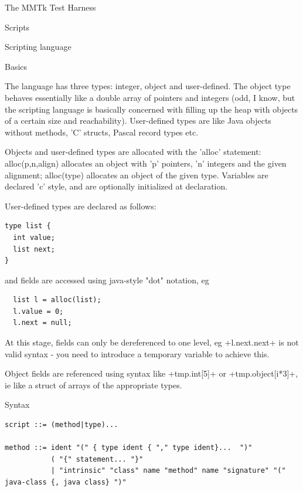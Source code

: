 \begin{section}{The MMTk Test Harness}
\begin{subsection}{Scripts}
\end{subsection}

\begin{subsection}{Scripting language}

\begin{subsubsection}{Basics}

The language has three types: integer, object and user-defined. The object type behaves essentially like a double array of pointers and integers (odd, I know, but the scripting language is basically concerned with filling up the heap with objects of a certain size and reachability).  User-defined types are like Java objects without methods, 'C' structs, Pascal record types etc.

Objects and user-defined types are allocated with the 'alloc' statement: alloc(p,n,align) allocates an object with 'p' pointers, 'n' integers and the given alignment; alloc(type) allocates an object of the given type.  Variables are declared 'c' style, and are optionally initialized at declaration.

User-defined types are declared as follows:

\begin{lstlisting}
type list {
  int value;
  list next;
}
\end{lstlisting}

and fields are accessed using java-style "dot" notation, eg
\begin{lstlisting}
  list l = alloc(list);
  l.value = 0;
  l.next = null;
\end{lstlisting}

At this stage, fields can only be dereferenced to one level, eg \spverb+l.next.next+ is not valid syntax - you need to introduce a temporary variable to achieve this.

Object fields are referenced using syntax like \spverb+tmp.int[5]+ or \spverb+tmp.object[i*3]+,
ie like a struct of arrays of the appropriate types.

\end{subsubsection}

\begin{subsubsection}{Syntax}

\begin{lstlisting}
script ::= (method|type)...

method ::= ident "(" { type ident { "," type ident}...  ")"
           ( "{" statement... "}"
           | "intrinsic" "class" name "method" name "signature" "(" java-class {, java class} ")"


\end{lstlisting}
\end{subsubsection}
\end{subsection}
\end{section}
